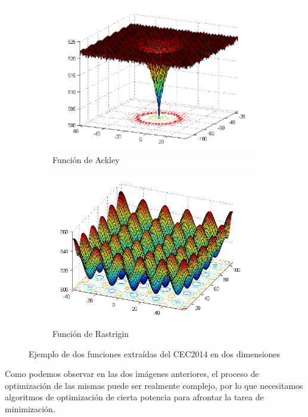 \documentclass[
  a4paper,
,tablecaptionabove
]{scrartcl}
\begin{document}
\begin{figure}[H]
\centering
\begin{subfigure}{0.5\textwidth}
 \centering
  \includegraphics[width=\textwidth]{imgs/F5.png}
  \caption{Función de Ackley}
  \label{fig:sub1}
\end{subfigure}%
\begin{subfigure}{.5\textwidth}
  \centering
  \includegraphics[width=\textwidth]{imgs/F8.png}
  \caption{Función de Rastrigin}
  \label{fig:sub2}
\end{subfigure}
\caption{Ejemplo de dos funciones extraídas del CEC2014 en dos dimensiones}
\label{fig:test}
\end{figure}

Como podemos observar en las dos imágenes anteriores, el proceso de
optimización de las mismas puede ser realmente complejo, por lo que
necesitamos algoritmos de optimización de cierta potencia para afrontar
la tarea de minimización.
\end{document}
